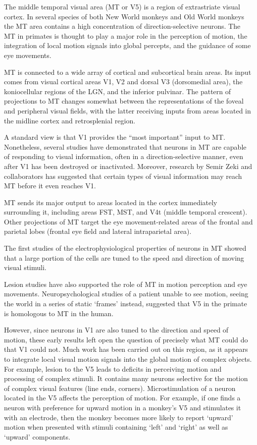 The middle temporal visual area (MT or V5) is a region of extrastriate visual cortex. In several species of both New World monkeys and Old World monkeys the MT area contains a high concentration of direction-selective neurons. The MT in primates is thought to play a major role in the perception of motion, the integration of local motion signals into global percepts, and the guidance of some eye movements.

MT is connected to a wide array of cortical and subcortical brain areas. Its input comes from visual cortical areas V1, V2 and dorsal V3 (dorsomedial area), the koniocellular regions of the LGN, and the inferior pulvinar. The pattern of projections to MT changes somewhat between the representations of the foveal and peripheral visual fields, with the latter receiving inputs from areas located in the midline cortex and retrosplenial region.

A standard view is that V1 provides the ``most important'' input to MT. Nonetheless, several studies have demonstrated that neurons in MT are capable of responding to visual information, often in a direction-selective manner, even after V1 has been destroyed or inactivated. Moreover, research by Semir Zeki and collaborators has suggested that certain types of visual information may reach MT before it even reaches V1.

MT sends its major output to areas located in the cortex immediately surrounding it, including areas FST, MST, and V4t (middle temporal crescent). Other projections of MT target the eye movement-related areas of the frontal and parietal lobes (frontal eye field and lateral intraparietal area).

The first studies of the electrophysiological properties of neurons in MT showed that a large portion of the cells are tuned to the speed and direction of moving visual stimuli.

Lesion studies have also supported the role of MT in motion perception and eye movements. Neuropsychological studies of a patient unable to see motion, seeing the world in a series of static `frames' instead, suggested that V5 in the primate is homologous to MT in the human.

However, since neurons in V1 are also tuned to the direction and speed of motion, these early results left open the question of precisely what MT could do that V1 could not. Much work has been carried out on this region, as it appears to integrate local visual motion signals into the global motion of complex objects. For example, lesion to the V5 leads to deficits in perceiving motion and processing of complex stimuli. It contains many neurons selective for the motion of complex visual features (line ends, corners). Microstimulation of a neuron located in the V5 affects the perception of motion. For example, if one finds a neuron with preference for upward motion in a monkey's V5 and stimulates it with an electrode, then the monkey becomes more likely to report `upward' motion when presented with stimuli containing `left' and `right' as well as `upward' components.

